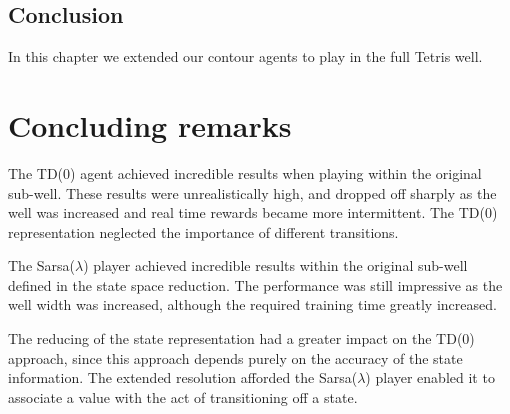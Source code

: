 \documentclass{rucsthesis}
\begin{document}
\section{Conclusion}

In this chapter we extended our contour agents to play in the full Tetris well.

\chapter{Concluding remarks}

The TD(0) agent achieved incredible results when playing within the original sub-well. These results were unrealistically high, and dropped off sharply as the well was increased and real time rewards became more intermittent. The TD(0) representation neglected the importance of different transitions.

The Sarsa($\lambda$) player achieved incredible results within the original sub-well defined in the state space reduction. The performance was still impressive as the well width was increased, although the required training time greatly increased.

The reducing of the state representation had a greater impact on the TD(0) approach, since this approach depends purely on the accuracy of the state information. The extended resolution afforded the Sarsa($\lambda$) player enabled it to associate a value with the act of transitioning off a state. 


\end{document}

